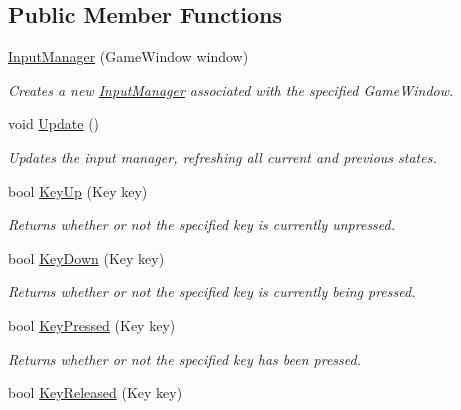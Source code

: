 \subsection*{Public Member Functions}
\begin{DoxyCompactItemize}
\item 
\hyperlink{class_tri_devs_1_1_tri_engine2_d_1_1_input_1_1_input_manager_a02702caed51c03cab2ec810cfa4b3301}{Input\-Manager} (Game\-Window window)
\begin{DoxyCompactList}\small\item\em Creates a new \hyperlink{class_tri_devs_1_1_tri_engine2_d_1_1_input_1_1_input_manager}{Input\-Manager} associated with the specified Game\-Window. \end{DoxyCompactList}\item 
void \hyperlink{class_tri_devs_1_1_tri_engine2_d_1_1_input_1_1_input_manager_a5ef0bd64a85fdafc34324cf231038302}{Update} ()
\begin{DoxyCompactList}\small\item\em Updates the input manager, refreshing all current and previous states. \end{DoxyCompactList}\item 
bool \hyperlink{class_tri_devs_1_1_tri_engine2_d_1_1_input_1_1_input_manager_a61294c18027c7129a27a650534b655b3}{Key\-Up} (Key key)
\begin{DoxyCompactList}\small\item\em Returns whether or not the specified key is currently unpressed. \end{DoxyCompactList}\item 
bool \hyperlink{class_tri_devs_1_1_tri_engine2_d_1_1_input_1_1_input_manager_a66a3455e413034020156039938390d29}{Key\-Down} (Key key)
\begin{DoxyCompactList}\small\item\em Returns whether or not the specified key is currently being pressed. \end{DoxyCompactList}\item 
bool \hyperlink{class_tri_devs_1_1_tri_engine2_d_1_1_input_1_1_input_manager_ab3a260ea268b4683596ff5a244fd2d95}{Key\-Pressed} (Key key)
\begin{DoxyCompactList}\small\item\em Returns whether or not the specified key has been pressed. \end{DoxyCompactList}\item 
bool \hyperlink{class_tri_devs_1_1_tri_engine2_d_1_1_input_1_1_input_manager_a1e74615e2ccde33e98d262d3c48d729a}{Key\-Released} (Key key)

\end{DoxyCompactItemize}
